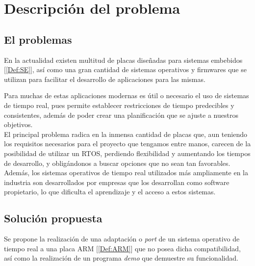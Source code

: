 \chapter{Descripción del problema}
\section{El problemas}
En la actualidad existen multitud de placas diseñadas para sistemas embebidos [\ref{Def:SE}], así como una gran cantidad de sistemas operativos y firmwares que se utilizan para facilitar el desarrollo de aplicaciones para las mismas.

Para muchas de estas aplicaciones modernas es útil o necesario el uso de sistemas de tiempo real, pues permite establecer restricciones de tiempo predecibles y consistentes, además de poder crear una planificación que se ajuste a nuestros objetivos.\\

El principal problema radica en la inmensa cantidad de placas que, aun teniendo los requisitos necesarios para el proyecto que tengamos entre manos, carecen de la posibilidad de utilizar un RTOS, perdiendo flexibilidad y aumentando los tiempos de desarrollo, y obligándonos a buscar opciones que no sean tan favorables.
Además, los sistemas operativos de tiempo real utilizados más ampliamente en la industria son desarrollados por empresas que los desarrollan como software propietario, lo que dificulta el aprendizaje y el acceso a estos sistemas.


\section{Solución propuesta}
Se propone la realización de una adaptación o \emph{port} de un sistema operativo de tiempo real a una placa ARM [\ref{Def:ARM}] que no posea dicha compatibilidad, así como la realización de un programa \emph{demo} que demuestre su funcionalidad.


